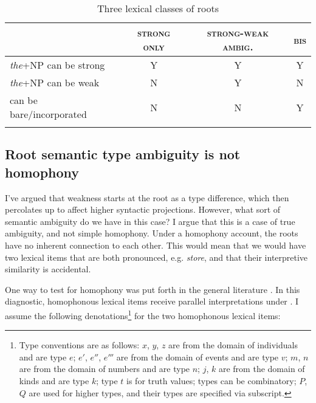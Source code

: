 \documentclass[output=paper,
modfonts
]{langscibook}
\begin{document}
\begin{table}[h]
\caption{Three lexical classes of roots}
\label{tab:williams:3}
\begin{tabularx}{\textwidth}{lccc} 
 \lsptoprule
 & \textsc{strong only} & \textsc{strong-weak ambig.}  & \textsc{bis}\\ 
 \midrule
 \textit{the}+NP can be strong  &  \textsc{Y} &     \textsc{Y}  &  \textsc{Y}  \\
 \textit{the}+NP can be weak  &   \textsc{N}  & \textsc{Y} & \textsc{N} \\
 can be bare/incorporated  &   \textsc{N}  & \textsc{N} & \textsc{Y} \\
 \lspbottomrule
\end{tabularx}
\end{table}

\subsection{Root semantic type ambiguity is not homophony}

I've argued that weakness starts at the root as a type difference, which then percolates up to affect higher syntactic projections. However, what sort of semantic ambiguity do we have in this case? I argue that this is a case of true ambiguity, and not simple homophony.  Under a homophony account, the roots have no inherent connection to each other. This would mean that we would have two lexical items that are both pronounced, e.g. \textit{store}, and that their interpretive similarity is accidental. 

One way to test for homophony was put forth in the general  literature \citep{RullmannYou2006,wilhelm2008}. In this diagnostic, homophonous lexical items receive parallel interpretations under . I assume the following denotations\footnote{Type conventions are as follows: $x$, $y$, $z$ are from the domain of individuals and are type $e$; $e'$, $e''$, $e'''$ are from the domain of events and are type $v$; $m$, $n$ are from the domain of numbers and are type $n$; $j$, $k$ are from the domain of kinds and are type $k$; type $t$ is for truth values; types can be combinatory; $P$, $Q$ are used for higher types, and their types are specified via subscript.} for the two homophonous lexical items: 

\begin{exe}
\end{exe}
\end{document}
